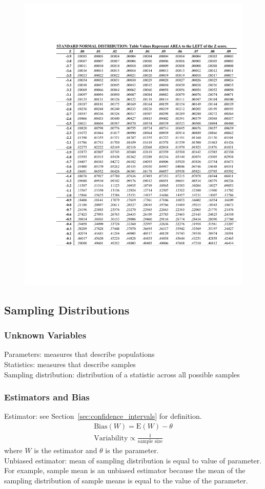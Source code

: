 \documentclass[12pt]{article}
\numberwithin{equation}{section}
\begin{document}
\begin{figure}[!ht]
    \centering
    \includegraphics[page=2, width=0.9\linewidth, trim=4.1cm 4cm 1.15cm 4cm]{figures and tables/standardnormaltable.pdf}
\end{figure}

\subsection{Sampling Distributions}

\subsubsection{Unknown Variables}
Parameters: measures that describe populations \\
Statistics: measures that describe samples \\
Sampling distribution: distribution of a statistic across all possible samples

\subsubsection{Estimators and Bias}
Estimator: see Section~\ref{sec:confidence_intervals} for definition.
\begin{gather}
    \text{Bias}(W) = \text{E}(W)-\theta \\
    \text{Variability} \propto \frac{1}{\text{sample size}}
\end{gather}
where $W$ is the estimator and $\theta$ is the parameter. \\[0.5cm]
Unbiased estimator: mean of sampling distribution is equal to value of parameter. For example, sample mean is an unbiased estimator because the mean of the sampling distribution of sample means is equal to the value of the parameter.
\end{document}
